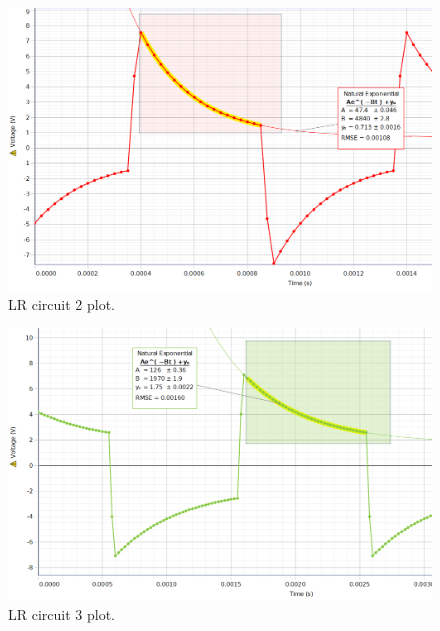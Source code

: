 \documentclass[12pt]{article}
\begin{document}
        \begin{figure}[H]
            \centering
            \includegraphics[width=0.75\linewidth]{LR2.png}
            \caption{LR circuit 2 plot.}
        \end{figure}
        \begin{figure}[H]
            \centering
            \includegraphics[width=0.75\linewidth]{LR3.png}
            \caption{LR circuit 3 plot.}
        \end{figure}
\end{document}
